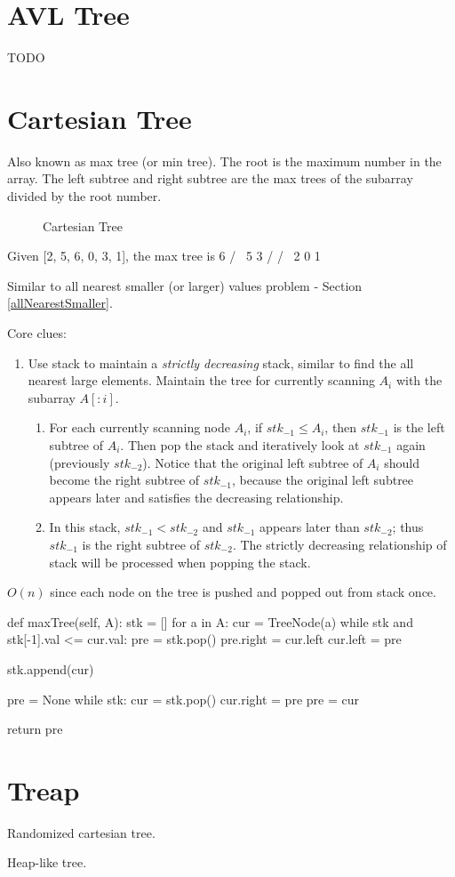 \section{AVL Tree}
TODO

\section{Cartesian Tree}
Also known as max tree (or min tree). The root is the maximum number in the array. The left subtree and right subtree are the max trees of the subarray divided by the root number.
\begin{figure}[hbtp]
\centering
{}
\caption{Cartesian Tree}
\label{fig:cartesianTree}
\end{figure}
\begin{java}
Given [2, 5, 6, 0, 3, 1], the max tree is
     6
    / \
   5   3
  /   / \
 2   0   1
\end{java}
 Similar to all nearest smaller (or larger) values problem - Section \ref{allNearestSmaller}.

Core clues:
\begin{enumerate}
\item Use stack to maintain a \textit{strictly decreasing} stack, similar to find the all nearest large elements.
\itm Maintain the tree for currently scanning $A_i$ with the subarray $A[:i]$.
\begin{enumerate}
\item \rih{Left tree.} For each currently scanning node $A_i$, if ${stk}_{-1} \leq A_i$, then ${stk}_{-1}$ is the left subtree of $A_i$. Then pop the stack and iteratively look at ${stk}_{-1}$ again (previously ${stk}_{-2}$). Notice that the original left subtree of $A_i$ should become the right subtree of ${stk}_{-1} $, because the original left subtree appears later and satisfies the decreasing relationship.
\item {} In this stack, ${stk}_{-1} < {stk}_{-2}$ and ${stk}_{-1}$ appears later than ${stk}_{-2}$; thus ${stk}_{-1}$ is the right subtree of ${stk}_{-2}$. The strictly decreasing relationship of stack will be processed when popping the stack. 
\end{enumerate}
\end{enumerate}

$O(n)$ since each node on the tree is pushed and popped out from stack once.

\begin{python}
def maxTree(self, A):
    stk = []
    for a in A:
        cur = TreeNode(a)
        while stk and stk[-1].val <= cur.val:
            pre = stk.pop()
            pre.right = cur.left
            cur.left = pre

        stk.append(cur)

    pre = None
    while stk:
        cur = stk.pop()
        cur.right = pre
        pre = cur

    return pre
\end{python}
\section{Treap}
Randomized cartesian tree. 

Heap-like tree. 
